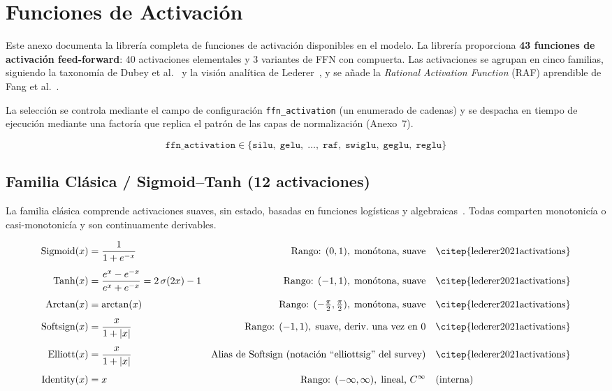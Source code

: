\section{Funciones de Activación}
\label{sec:annex-funciones-activacion}

Este anexo documenta la librería completa de funciones de activación
disponibles en el modelo. La librería proporciona \textbf{43 funciones de
activación feed-forward}: 40 activaciones elementales y 3 variantes de FFN con
compuerta. Las activaciones se agrupan en cinco familias, siguiendo la
taxonomía de Dubey et al.~\citep{dubey2021activations} y la visión analítica de
Lederer~\citep{lederer2021activations}, y se añade la \emph{Rational Activation
Function} (RAF) aprendible de Fang et al.~\citep{fang2023raft}.

La selección se controla mediante el campo de configuración
\texttt{ffn\_activation} (un enumerado de cadenas) y se despacha en tiempo de
ejecución mediante una factoría que replica el patrón de las capas de
normalización (Anexo~7).

\[
\texttt{ffn\_activation} \in \{\texttt{silu},\;\texttt{gelu},\;\dots,\;
\texttt{raf},\;\texttt{swiglu},\;\texttt{geglu},\;\texttt{reglu}\}
\]

\subsection{Familia Clásica / Sigmoid--Tanh (12 activaciones)}

La familia clásica comprende activaciones suaves, sin estado, basadas en
funciones logísticas y algebraicas~\citep{lederer2021activations,dubey2021activations}.
Todas comparten monotonicía o casi-monotonicía y son continuamente derivables.

{\footnotesize
\begin{align}
  \text{Sigmoid}(x) &= \frac{1}{1+e^{-x}}
    & \text{Rango: } (0,1),\;\text{monótona, suave}
    & \quad \text{\citep{lederer2021activations}} \\[4pt]
  \text{Tanh}(x) &= \frac{e^{x}-e^{-x}}{e^{x}+e^{-x}} = 2\,\sigma(2x)-1
    & \text{Rango: } (-1,1),\;\text{monótona, suave}
    & \quad \text{\citep{lederer2021activations}} \\[4pt]
  \text{Arctan}(x) &= \arctan(x)
    & \text{Rango: } (-\tfrac{\pi}{2},\tfrac{\pi}{2}),\;\text{monótona, suave}
    & \quad \text{\citep{lederer2021activations}} \\[4pt]
  \text{Softsign}(x) &= \frac{x}{1+|x|}
    & \text{Rango: } (-1,1),\;\text{suave, deriv.\ una vez en 0}
    & \quad \text{\citep{lederer2021activations}} \\[4pt]
  \text{Elliott}(x) &= \frac{x}{1+|x|}
    & \text{Alias de Softsign (notación ``elliottsig'' del survey)}
    & \quad \text{\citep{lederer2021activations}} \\[4pt]
  \text{Identity}(x) &= x
    & \text{Rango: } (-\infty,\infty),\;\text{lineal, }C^\infty
    & \quad \text{(interna)}
\end{align}
}  %

